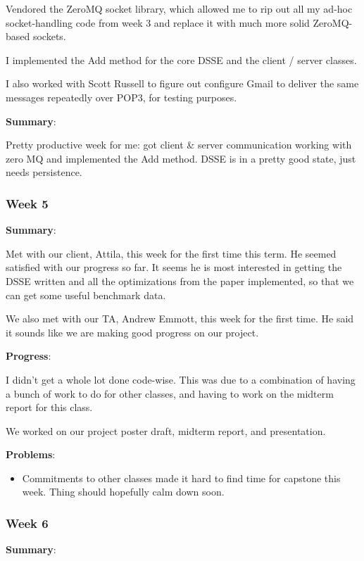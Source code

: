 Vendored the ZeroMQ socket library, which allowed me to rip out all my ad-hoc socket-handling code from week 3 and replace it with much more solid ZeroMQ-based sockets.
 
I implemented the Add method for the core DSSE and the client / server classes.
 
I also worked with Scott Russell to figure out configure Gmail to deliver the same messages repeatedly over POP3, for testing purposes. 

\noindent \textbf{Summary}:

Pretty productive week for me: got client \& server communication working with zero MQ and implemented the Add method. DSSE is in a pretty good state, just needs persistence.

\subsubsection{Week 5}

\noindent \textbf{Summary}:

Met with our client, Attila, this week for the first time this term. He seemed satisfied with our progress so far. It seems he is most interested in getting the DSSE written and all the optimizations from the paper implemented, so that we can get some useful benchmark data. 

We also met with our TA, Andrew Emmott, this week for the first time.
He said it sounds like we are making good progress on our project.

\noindent \textbf{Progress}:

I didn't get a whole lot done code-wise. This was due to a combination of having a bunch of work to do for other classes, and having to work on the midterm report for this class.

We worked on our project poster draft, midterm report, and presentation.

\noindent \textbf{Problems}:

\begin{itemize}
\item Commitments to other classes made it hard to find time for capstone this week. Thing should hopefully calm down soon.
\end{itemize}


\subsubsection{Week 6}

\noindent \textbf{Summary}:

